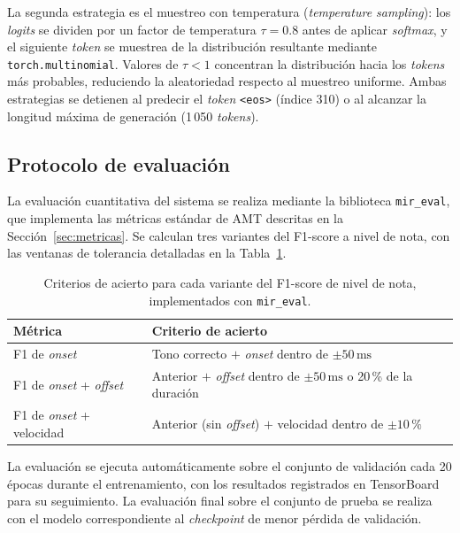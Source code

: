 La segunda estrategia es el muestreo con temperatura (\textit{temperature
sampling}): los \textit{logits} se dividen por un factor de temperatura
$\tau = 0.8$ antes de aplicar \textit{softmax}, y el siguiente
\textit{token} se muestrea de la distribución resultante mediante
\texttt{torch.multinomial}. Valores de $\tau < 1$ concentran la
distribución hacia los \textit{tokens} más probables, reduciendo la
aleatoriedad respecto al muestreo uniforme. Ambas estrategias se
detienen al predecir el \textit{token} \texttt{<eos>} (índice 310) o al
alcanzar la longitud máxima de generación (1\,050 \textit{tokens}).

\subsection{Protocolo de evaluación}

La evaluación cuantitativa del sistema se realiza mediante la biblioteca
\texttt{mir\_eval}, que implementa las métricas estándar de AMT descritas
en la Sección~\ref{sec:metricas}. Se calculan tres variantes del
F1-score a nivel de nota, con las ventanas de tolerancia detalladas en
la Tabla~\ref{tab:tolerancias_evaluacion}.

\begin{table}[htbp]
    \centering
    \renewcommand{\arraystretch}{1.2}
    \begin{tabular}{l l}
        \hline
        \textbf{Métrica} & \textbf{Criterio de acierto} \\
        \hline
        F1 de \textit{onset}
            & Tono correcto $+$ \textit{onset} dentro de
              $\pm 50\,\mathrm{ms}$ \\
        F1 de \textit{onset} + \textit{offset}
            & Anterior $+$ \textit{offset} dentro de
              $\pm 50\,\mathrm{ms}$ o 20\,\% de la duración \\
        F1 de \textit{onset} + velocidad
            & Anterior (sin \textit{offset}) $+$ velocidad
              dentro de $\pm 10\,\%$ \\
        \hline
    \end{tabular}
    \caption{Criterios de acierto para cada variante del F1-score de
    nivel de nota, implementados con \texttt{mir\_eval}.}
    \label{tab:tolerancias_evaluacion}
\end{table}

La evaluación se ejecuta automáticamente sobre el conjunto de validación
cada 20 épocas durante el entrenamiento, con los resultados registrados
en TensorBoard para su seguimiento. La evaluación final sobre el conjunto
de prueba se realiza con el modelo correspondiente al \textit{checkpoint} de menor pérdida de
validación.

